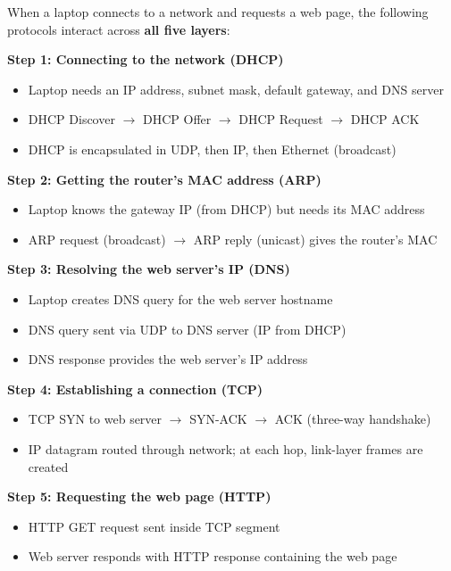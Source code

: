 \begin{keybox}
When a laptop connects to a network and requests a web page, the following protocols interact across \textbf{all five layers}:

\textbf{Step 1: Connecting to the network (DHCP)}
\begin{itemize}[noitemsep]
    \item Laptop needs an IP address, subnet mask, default gateway, and DNS server
    \item DHCP Discover $\to$ DHCP Offer $\to$ DHCP Request $\to$ DHCP ACK
    \item DHCP is encapsulated in UDP, then IP, then Ethernet (broadcast)
\end{itemize}

\textbf{Step 2: Getting the router's MAC address (ARP)}
\begin{itemize}[noitemsep]
    \item Laptop knows the gateway IP (from DHCP) but needs its MAC address
    \item ARP request (broadcast) $\to$ ARP reply (unicast) gives the router's MAC
\end{itemize}

\textbf{Step 3: Resolving the web server's IP (DNS)}
\begin{itemize}[noitemsep]
    \item Laptop creates DNS query for the web server hostname
    \item DNS query sent via UDP to DNS server (IP from DHCP)
    \item DNS response provides the web server's IP address
\end{itemize}

\textbf{Step 4: Establishing a connection (TCP)}
\begin{itemize}[noitemsep]
    \item TCP SYN to web server $\to$ SYN-ACK $\to$ ACK (three-way handshake)
    \item IP datagram routed through network; at each hop, link-layer frames are created
\end{itemize}

\textbf{Step 5: Requesting the web page (HTTP)}
\begin{itemize}[noitemsep]
    \item HTTP GET request sent inside TCP segment
    \item Web server responds with HTTP response containing the web page
\end{itemize}
\end{keybox}

